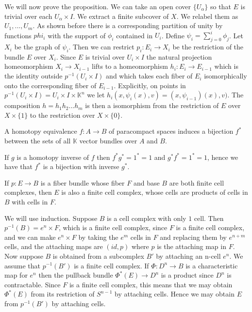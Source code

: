 \documentclass[../Thesis.tex]{subfiles}
\begin{document}
\begin{myproof}
We will now prove the proposition. We can take an open cover $\{U_\alpha\}$ so that $E$ is trivial over each $U_\alpha \times I$. We extract a finite subcover of $X$. We relabel them as $U_1, ..., U_m$. As shown before there is a corresponding partition of unity by functions $phi_i$ with the support of $\phi_i$ contained in $U_i$. Define $\psi_i = \sum_{j = 0}^i \phi_j$. Let $X_i$ be the graph of $\psi_i$. Then we can restrict $p_i : E_i \rightarrow X_i$ be the restriction of the bundle $E$ over $X_i$. Since $E$ is trivial over $U_i \times I$ the natural projection homeomorphism $X_i \rightarrow X_{i-1}$ lifts to a homeomorphism $h_i : E_i \rightarrow E_{i-1}$ which is the identity outside $p^{-1}( U_i \times I)$ and which takes each fiber of $E_i$ isomorphically onto the corresponding fiber of $E_{i-1}$. Explicitly, on points in $p^{-1}(U_i \times I) = U_i \times I \times \mathbb{K}^n$ we let $h_i(x, \psi_i(x), v) = (x, \psi_{i-1})(x), v)$. The composition $h = h_1h_2...h_m$ is then a isomorphism from the restriction of $E$ over $X \times \{1\}$ to the restriction over $ X \times \{0\}$.

\end{myproof}





\begin{Cor}
A homotopy equivalence $f: A \rightarrow B$ of paracompact spaces induces a bijection $f^*$ between the sets of all $\mathbb{K}$ vector bundles over $A$ and $B$.
\end{Cor}
\begin{myproof}
If $g$ is a homotopy inverse of $f$ then $f^*g^* = 1^* = 1$ and $g^*f^* = 1^* = 1$, hence we have that $f^*$ is a bijection with inverse $g^*$.
\end{myproof}
\begin{prop}
If $p : E \rightarrow B$ is a fiber bundle whose fiber $F$ and base $B$ are both finite cell complexes, then $E$ is also a finite cell complex, whose cells are products of cells in $B$ with cells in $F$.
\end{prop}
\begin{myproof}
We will use induction. 
Suppose $B$ is a cell complex with only $1$ cell. Then $p^{-1}(B) = e^n \times F$, which is a finite cell complex, since $F$ is a finite cell complex, and we can make $e^n \times F$ by taking the $e^m$ cells in $F$ and replacing them by $e^{n+m}$ cells, and the attaching maps are $(id,p)$ where $p$ is the attaching map in $F$.
\\Now suppose $B$ is obtained from a subcomplex $B'$ by attaching an n-cell $e^n$. We assume that $p^{-1}(B')$ is a finite cell complex.  If $\Phi : D^n \rightarrow B$ is a characteristic map for $e^n$ then the pullback bundle $\Phi^* (E) \rightarrow D^n$ is a product since $D^n$ is contractable. Since $F$ is a finite cell complex, this means that we may obtain $\Phi^*(E)$ from its restriction of $S^{n-1}$ by attaching cells. Hence we may obtain $E$ from $p^{-1}(B')$ by attaching cells.
\end{myproof}
\end{document}
